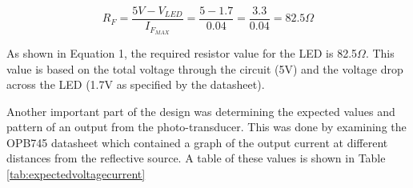 \documentclass[conference]{IEEEtran}
\begin{document}
\begin{equation}
    R_F=\frac{5V-V_{LED}}{I_{F_{MAX}}}=\frac{5-1.7}{0.04}=\frac{3.3}{0.04}=82.5\Omega
\end{equation}

As shown in Equation 1, the required resistor value for the LED is 82.5$\Omega$. This value is based on the total voltage through the
circuit (5V) and the voltage drop across the LED (1.7V as specified by the datasheet).

Another important part of the design was determining the expected values and pattern of an output from the photo-transducer. This was
done by examining the OPB745 datasheet which contained a graph of the output current at different distances from the reflective source.
A table of these values is shown in Table \ref{tab:expectedvoltagecurrent}
\end{document}
